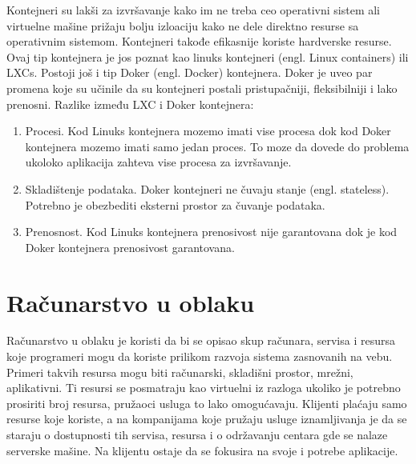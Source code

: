 \documentclass[12pt,oneside]{memoir}
\begin{document}
Kontejneri su lakši za izvršavanje kako im ne treba ceo operativni sistem ali virtuelne mašine prižaju bolju izloaciju kako ne dele direktno resurse sa operativnim sistemom. Kontejneri takođe efikasnije koriste hardverske resurse. Ovaj tip kontejnera je jos poznat kao linuks kontejneri (engl. Linux containers) ili LXCs. Postoji još i tip Doker (engl. Docker) kontejnera. Doker je uveo par promena koje su učinile da su kontejneri postali pristupačniji, fleksibilniji i lako prenosni\cite{gswc}. Razlike između LXC i Doker kontejnera:
\begin{enumerate}
  \item Procesi. Kod Linuks kontejnera mozemo imati vise procesa dok kod Doker kontejnera mozemo imati samo jedan proces. To moze da dovede do problema ukoloko aplikacija zahteva vise procesa za izvršavanje.
  \item Skladištenje podataka. Doker kontejneri ne čuvaju stanje (engl. stateless). Potrebno je obezbediti eksterni prostor za čuvanje podataka.
  \item Prenosnost. Kod Linuks kontejnera prenosivost nije garantovana dok je kod Doker kontejnera prenosivost garantovana.
\end{enumerate}

\section{Računarstvo u oblaku}

Računarstvo u oblaku je koristi da bi se opisao skup računara, servisa i resursa koje programeri mogu da koriste prilikom razvoja sistema zasnovanih na vebu. Primeri takvih resursa mogu biti računarski, skladišni prostor, mrežni, aplikativni. Ti resursi se posmatraju kao virtuelni iz razloga ukoliko je potrebno prosiriti broj resursa, pružaoci usluga to lako omogućavaju. Klijenti plaćaju samo resurse koje koriste, a na kompanijama koje pružaju usluge iznamljivanja je da se staraju o dostupnosti tih servisa, resursa i o održavanju centara gde se nalaze serverske mašine. Na klijentu ostaje da se fokusira na svoje i potrebe aplikacije\cite{cc}.
\end{document}
